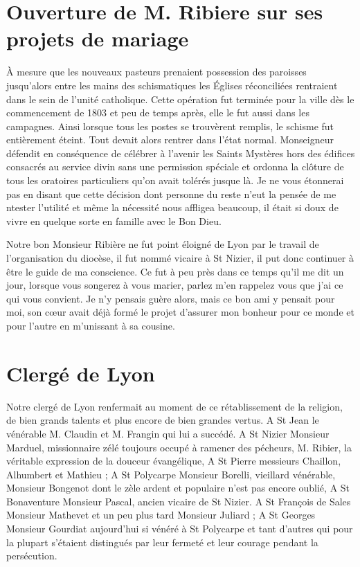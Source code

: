 \documentclass[11pt,a4paper]{report}
\begin{document}
\section*{Ouverture de M. Ribiere sur ses projets de mariage}

À mesure que les nouveaux pasteurs prenaient possession des paroisses jusqu'alors entre les mains des schismatiques les Églises réconciliées rentraient dans le sein de l'unité catholique. Cette opération fut terminée pour la ville dès le commencement de 1803 et peu de temps après, elle le fut aussi dans les campagnes. Ainsi lorsque tous les postes se trouvèrent remplis, le schisme fut entièrement éteint. Tout devait alors rentrer dans l'état normal. Monseigneur défendit en conséquence de célébrer à l'avenir les Saints Mystères hors des édifices consacrés au service divin sans une permission spéciale et ordonna la clôture de tous les oratoires particuliers qu'on avait tolérés jusque là. Je ne vous étonnerai pas en disant que cette décision dont personne du reste n'eut la pensée de me ntester l'utilité et même la nécessité nous affligea beaucoup, il était si doux de vivre en quelque sorte en famille avec le Bon Dieu.

Notre bon Monsieur Ribière ne fut point éloigné de Lyon par le travail de l'organisation du diocèse, il fut nommé vicaire à St Nizier, il put donc continuer à être le guide de ma conscience. Ce fut à peu près dans ce temps qu'il me dit un jour, lorsque vous songerez à vous marier, parlez m'en rappelez vous que j'ai ce qui vous convient. Je n'y pensais guère alors, mais ce bon ami y pensait pour moi, son cœur avait déjà formé le projet d'assurer mon bonheur pour ce monde et pour l'autre en m'unissant à sa cousine.

\section*{Clergé de Lyon}

Notre clergé de Lyon renfermait au moment de ce rétablissement de la religion, de bien grands talents et plus encore de bien grandes vertus. A St Jean le vénérable M. Claudin et M. Frangin qui lui a succédé. A St Nizier Monsieur Marduel, missionnaire zélé toujours occupé à ramener des pécheurs, M. Ribier, la véritable expression de la douceur évangélique, A St Pierre messieurs Chaillon, Alhumbert et Mathieu ; A St Polycarpe Monsieur Borelli, vieillard vénérable, Monsieur Bongenot dont le zèle ardent et populaire n'est pas encore oublié, A St Bonaventure Monsieur Pascal, ancien vicaire de St Nizier. A St François de Sales Monsieur Mathevet et un peu plus tard Monsieur Juliard ; A St Georges Monsieur Gourdiat aujourd'hui si vénéré à St Polycarpe et tant d'autres qui pour la plupart s'étaient distingués par leur fermeté et leur courage pendant la persécution.
\end{document}
